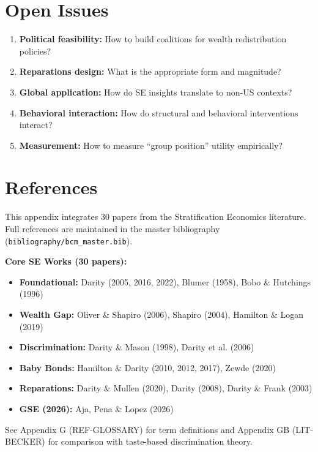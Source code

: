 \section{Open Issues}
\label{sec:se-open}

\begin{enumerate}
    \item \textbf{Political feasibility:} How to build coalitions for wealth redistribution policies?
    \item \textbf{Reparations design:} What is the appropriate form and magnitude?
    \item \textbf{Global application:} How do SE insights translate to non-US contexts?
    \item \textbf{Behavioral interaction:} How do structural and behavioral interventions interact?
    \item \textbf{Measurement:} How to measure ``group position'' utility empirically?
\end{enumerate}

\section{References}
\label{sec:se-references}

\nocite{bcm_master}

This appendix integrates 30 papers from the Stratification Economics literature. Full references are maintained in the master bibliography (\texttt{bibliography/bcm\_master.bib}).

\textbf{Core SE Works (30 papers):}
\begin{itemize}
    \item \textbf{Foundational:} Darity (2005, 2016, 2022), Blumer (1958), Bobo \& Hutchings (1996)
    \item \textbf{Wealth Gap:} Oliver \& Shapiro (2006), Shapiro (2004), Hamilton \& Logan (2019)
    \item \textbf{Discrimination:} Darity \& Mason (1998), Darity et al. (2006)
    \item \textbf{Baby Bonds:} Hamilton \& Darity (2010, 2012, 2017), Zewde (2020)
    \item \textbf{Reparations:} Darity \& Mullen (2020), Darity (2008), Darity \& Frank (2003)
    \item \textbf{GSE (2026):} Aja, Pena \& Lopez (2026)
\end{itemize}

See Appendix G (REF-GLOSSARY) for term definitions and Appendix GB (LIT-BECKER) for comparison with taste-based discrimination theory.


